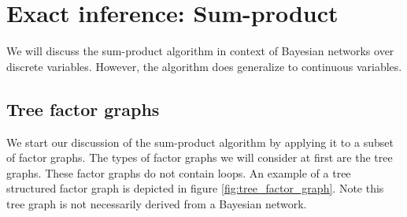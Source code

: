 \section{Exact inference: Sum-product}
We will discuss the sum-product algorithm in context of Bayesian
networks over discrete variables. However, the algorithm does generalize
to continuous variables. 

\subsection{Tree factor graphs}
We start our discussion of the sum-product algorithm by applying it
to a subset of factor graphs. The types of factor graphs we will 
consider at first are the tree graphs. These factor graphs do not
contain loops. An example of a tree structured factor graph is depicted
in figure \ref{fig:tree_factor_graph}. Note this tree graph is not
necessarily derived from a Bayesian network.

